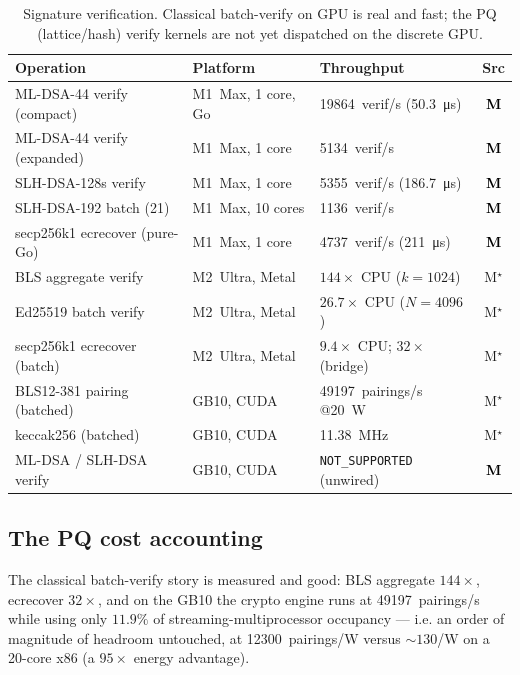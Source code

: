 \documentclass[11pt,a4paper]{article}
\newcommand{\Mnow}{\textbf{\textcolor{black}{M}}}      %
\newcommand{\Mprior}{M$^\star$}                          %
\begin{document}
\begin{table}[h]\centering\small
\begin{tabular}{@{}lll c@{}}
\toprule
Operation & Platform & Throughput & Src \\
\midrule
ML-DSA-44 verify (compact) & M1~Max, 1 core, Go & \SI{19864}{verif/s} (\SI{50.3}{\micro s}) & \Mnow \\
ML-DSA-44 verify (expanded) & M1~Max, 1 core     & \SI{5134}{verif/s}  & \Mnow \\
SLH-DSA-128s verify        & M1~Max, 1 core      & \SI{5355}{verif/s} (\SI{186.7}{\micro s}) & \Mnow \\
SLH-DSA-192 batch (21)     & M1~Max, 10 cores    & \SI{1136}{verif/s}  & \Mnow \\
secp256k1 ecrecover (pure-Go) & M1~Max, 1 core   & \SI{4737}{verif/s} (\SI{211}{\micro s}) & \Mnow \\
\midrule
BLS aggregate verify       & M2~Ultra, Metal     & $144\times$ CPU ($k{=}1024$) & \Mprior \\
Ed25519 batch verify       & M2~Ultra, Metal     & $26.7\times$ CPU ($N{=}4096$) & \Mprior \\
secp256k1 ecrecover (batch)& M2~Ultra, Metal     & $9.4\times$ CPU; $32\times$ (bridge) & \Mprior \\
BLS12-381 pairing (batched)& GB10, CUDA          & \SI{49197}{pairings/s} @\SI{20}{W} & \Mprior \\
keccak256 (batched)        & GB10, CUDA          & \SI{11.38}{MHz} & \Mprior \\
ML-DSA / SLH-DSA verify    & GB10, CUDA          & \texttt{NOT\_SUPPORTED} (unwired) & \Mnow \\
\bottomrule
\end{tabular}
\caption{Signature verification. Classical batch-verify on GPU is real
and fast; the PQ (lattice/hash) verify kernels are not yet dispatched on
the discrete GPU.}
\label{tab:l4}
\end{table}

\subsection{The PQ cost accounting}

The classical batch-verify story is measured and good: BLS aggregate
$144\times$, ecrecover $32\times$, and on the GB10 the crypto engine runs
at \SI{49197}{pairings/s} while using only $11.9\%$ of streaming-multiprocessor
occupancy \cite{lp203} --- i.e. an order of magnitude of headroom
untouched, at \SI{12300}{pairings/W} versus ${\sim}130$/W on a 20-core
x86 (a $95\times$ energy advantage).
\end{document}
